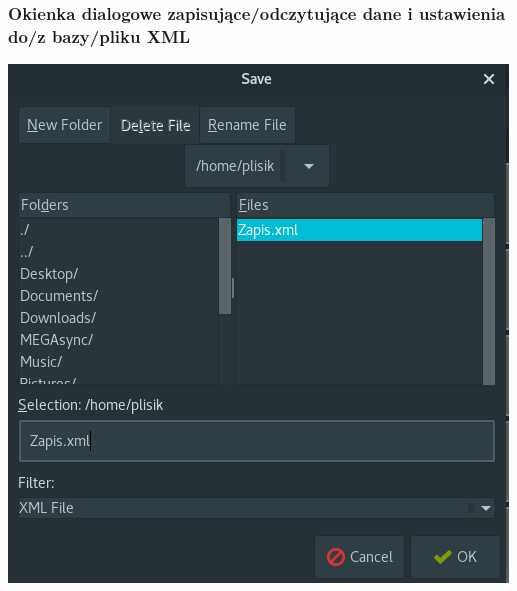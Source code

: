 \documentclass[a4paper,12pt]{article}
\begin{document}
\subsubsection{Okienka dialogowe zapisujące/odczytujące dane i ustawienia do/z bazy/pliku XML}
\begin{minipage}{\textwidth}

    \includegraphics[width=\textwidth]{./screen/AppScreen/SaveTo.png}
    \label{MainViewLinux}

\end{minipage}
\end{document}
